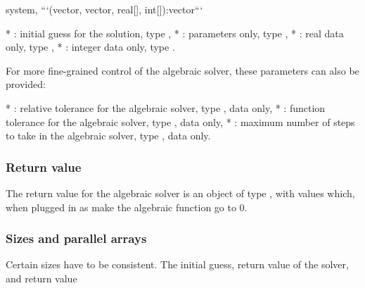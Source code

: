 \begin{description}
\begin{description}
\begin{description}
\begin{description}
\begin{description}
\begin{description}
\begin{description}
\begin{description}
\begin{description}
\begin{description}
\begin{description}
\begin{description}
\begin{description}
\begin{description}
\begin{description}
\begin{description}
\begin{description}
\begin{description}
\begin{description}
\begin{description}
\begin{description}
\begin{description}
\begin{description}
\begin{description}
\begin{description}
\begin{description}
\begin{description}
\begin{description}
\begin{description}
\begin{description}
\begin{description}
\begin{description}
\begin{description}
\begin{description}
\begin{description}
\begin{description}
\begin{description}
\begin{description}
\begin{description}
\begin{description}
\begin{description}
\begin{description}
\begin{description}
\begin{description}
\begin{description}
\begin{description}
\begin{description}
\begin{description}
\begin{description}
\begin{description}
\begin{description}
\begin{description}
\begin{description}
\begin{description}
\begin{description}
\begin{description}
\begin{description}
\begin{description}
\begin{description}
\begin{description}
\begin{description}
\begin{description}
\begin{description}
\begin{description}
\begin{description}
\begin{description}
\begin{description}
\begin{description}
\begin{description}
\begin{description}
\begin{description}
\begin{description}
\begin{description}
\begin{description}
\begin{description}
\begin{description}
\begin{description}
\begin{description}
\begin{description}
\begin{description}
\begin{description}
\begin{description}
system,
```\n(vector, vector, real[], int[]):vector\n```

 * : initial guess for the solution, type ,
 * : parameters only, type ,
 * : real data only, type ,
 * : integer data only, type .

For more fine-grained control of the algebraic solver, these parameters can also be provided:

 * : relative tolerance for the algebraic solver, type , data only,  
 * : function tolerance for the algebraic solver, type , data only,  
 * : maximum number of steps to take in the algebraic solver, type , data only.

\subsubsection{Return value}

The return value for the algebraic solver is an object of type , with values which, when plugged in as  make the algebraic function go to 0.

\subsubsection{Sizes and parallel arrays}

Certain sizes have to be consistent. The initial guess, return value of the solver, and return value 
\end{description}
\end{description}
\end{description}
\end{description}
\end{description}
\end{description}
\end{description}
\end{description}
\end{description}
\end{description}
\end{description}
\end{description}
\end{description}
\end{description}
\end{description}
\end{description}
\end{description}
\end{description}
\end{description}
\end{description}
\end{description}
\end{description}
\end{description}
\end{description}
\end{description}
\end{description}
\end{description}
\end{description}
\end{description}
\end{description}
\end{description}
\end{description}
\end{description}
\end{description}
\end{description}
\end{description}
\end{description}
\end{description}
\end{description}
\end{description}
\end{description}
\end{description}
\end{description}
\end{description}
\end{description}
\end{description}
\end{description}
\end{description}
\end{description}
\end{description}
\end{description}
\end{description}
\end{description}
\end{description}
\end{description}
\end{description}
\end{description}
\end{description}
\end{description}
\end{description}
\end{description}
\end{description}
\end{description}
\end{description}
\end{description}
\end{description}
\end{description}
\end{description}
\end{description}
\end{description}
\end{description}
\end{description}
\end{description}
\end{description}
\end{description}
\end{description}
\end{description}
\end{description}
\end{description}
\end{description}
\end{description}
\end{description}
